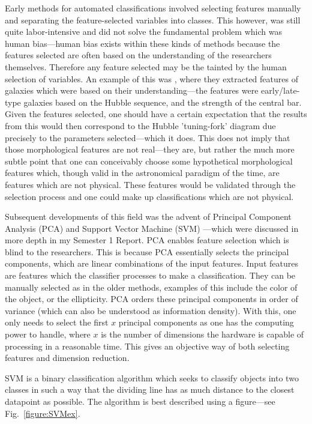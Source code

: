 \documentclass[a4paper,fleqn,usenatbib]{mnras}
\begin{document}
Early methods for automated classifications involved selecting features manually and separating the feature-selected variables into classes. This however, was still quite labor-intensive and did not solve the fundamental problem which was human bias---human bias exists within these kinds of methods because the features selected are often based on the understanding of the researchers themselves. Therefore any feature selected may be the tainted by the human selection of variables. An example of this was \citet{Abraham2000}, where they extracted features of galaxies which were based on their understanding---the features were early/late-type galaxies based on the Hubble sequence, and the strength of the central bar. Given the features selected, one should have a certain expectation that the results from this would then correspond to the Hubble 'tuning-fork' diagram due precisely to the parameters selected---which it does. This does not imply that those morphological features are not real---they are, but rather the much more subtle point that one can conceivably choose some hypothetical morphological features which, though valid in the astronomical paradigm of the time, are features which are not physical. These features would be validated through the selection process and one could make up classifications which are not physical. 

Subsequent developments of this field was the advent of Principal Component Analysis (PCA) \citep{PCA} and Support Vector Machine (SVM) \citep{SVM}---which were discussed in more depth in my Semester 1 Report. PCA enables feature selection which is blind to the researchers. This is because PCA essentially selects the principal components, which are linear combinations of the input features. Input features are features which the classifier processes to make a classification. They can be manually selected as in the older methods, examples of this include the color of the object, or the ellipticity. PCA orders these principal components in order of variance (which can also be understood as information density). With this, one only needs to select the first $x$ principal components as one has the computing power to handle, where $x$ is the number of dimensions the hardware is capable of processing in a reasonable time. This gives an objective way of both selecting features and dimension reduction. 

SVM is a binary classification algorithm which seeks to classify objects into two classes in such a way that the dividing line has as much distance to the closest datapoint as possible. The algorithm is best described using a figure---see Fig.~\ref{figure:SVMex}. \citep{SVM2}
\end{document}
